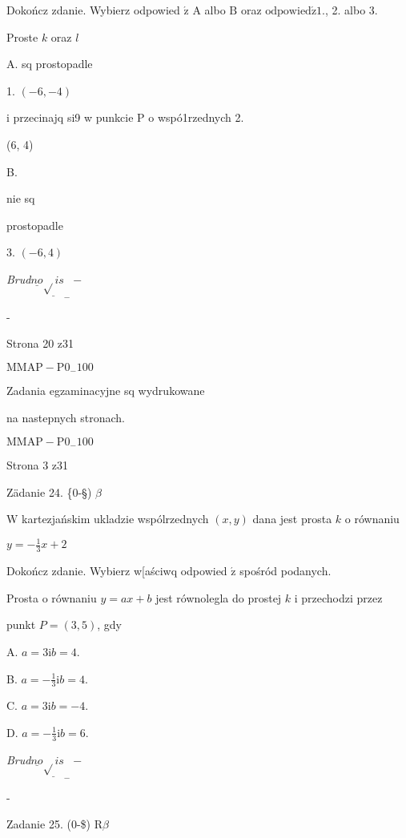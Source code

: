 \documentclass[a4paper,12pt]{article}
\begin{document}
Dokończ zdanie. Wybierz odpowied $\acute{\mathrm{z}}$ A albo $\mathrm{B}$ oraz $\mathrm{o}\mathrm{d}\mathrm{p}\mathrm{o}\mathrm{w}\mathrm{i}\mathrm{e}\mathrm{d}\acute{\mathrm{z}}1.$, 2. albo 3.

Proste $k$ oraz $l$

A. sq prostopadle

1. $(-6,-4)$

i przecinajq si9 w punkcie P o wspó1rzednych 2.

(6, 4)

B.

nie sq

prostopadle

3. $(-6,4)$

{\it Brud}$\underline{no}\underline{\sqrt{}is}_{-} -$

-

Strona 20 z31

$\mathrm{M}\mathrm{M}\mathrm{A}\mathrm{P}-\mathrm{P}0_{-}100$





Zadania egzaminacyjne sq wydrukowane

na nastepnych stronach.

$\mathrm{M}\mathrm{M}\mathrm{A}\mathrm{P}-\mathrm{P}0_{-}100$

Strona 3 z31





Zädanie 24. \{0-\S) $\beta$

$\mathrm{W}$ kartezjańskim ukladzie wspólrzednych $(x,y)$ dana jest prosta $k$ o równaniu

$y=-\displaystyle \frac{1}{3}x+2$

Dokończ zdanie. Wybierz w[aściwq odpowied $\acute{\mathrm{z}}$ spośród podanych.

Prosta o równaniu $y=ax+b$ jest równolegla do prostej $k$ i przechodzi przez

punkt $P=(3,5)$, gdy

A. $a=3 \mathrm{i} b=4.$

B. $a=-\displaystyle \frac{1}{3} \mathrm{i} b=4.$

C. $a=3 \mathrm{i} b=-4.$

D. $a=-\displaystyle \frac{1}{3} \mathrm{i} b=6.$

{\it Brud}$\underline{no}\underline{\sqrt{}is}_{-} -$

-

Zadanie 25. (0-{\$}) $\mathrm{R} \beta$
\end{document}
